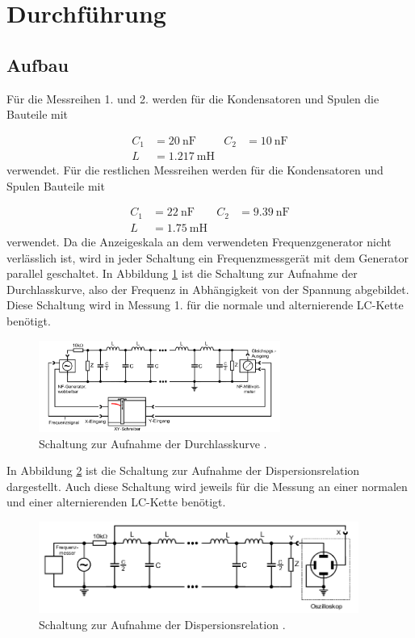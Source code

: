  \section{Durchführung}
\label{sec:Durchführung}


\subsection{Aufbau}

Für die Messreihen 1. und 2. werden für die Kondensatoren und Spulen die
Bauteile mit

\begin{align}
  C_1 & = \SI{20}{\nano\F} & C_2 & = \SI{10}{\nano\F} \\
  L & = \SI{1.217}{\milli\henry}
\end{align}
verwendet. Für die restlichen Messreihen werden für die Kondensatoren und Spulen
Bauteile mit

\begin{align}
  C_1 & = \SI{22}{\nano\F} & C_2 & = \SI{9.39}{\nano\F} \\
  L & = \SI{1.75}{\milli\henry}
\end{align}
verwendet.
Da die Anzeigeskala an dem verwendeten Frequenzgenerator nicht verlässlich ist,
wird in jeder Schaltung ein Frequenzmessgerät mit dem Generator parallel
geschaltet.
In Abbildung \ref{fig:DK} ist die Schaltung zur Aufnahme der Durchlasskurve,
also der Frequenz in Abhängigkeit von der Spannung abgebildet.
Diese Schaltung wird in Messung 1. für die normale und alternierende LC-Kette
benötigt.

\begin{figure}
  \centering
  \includegraphics[height=3cm]{DurchlasskurveLCkette.png}
  \caption{Schaltung zur Aufnahme der Durchlasskurve \cite{anleitung}.}
  \label{fig:DK}
\end{figure}

In Abbildung \ref{fig:DR} ist die Schaltung zur Aufnahme der
Dispersionsrelation dargestellt. Auch diese Schaltung wird jeweils für die
Messung an einer normalen und einer alternierenden LC-Kette benötigt.

\begin{figure}
  \centering
  \includegraphics[height=3cm]{DispersionC1C2.png}
  \caption{Schaltung zur Aufnahme der Dispersionsrelation \cite{anleitung}.}
  \label{fig:DR}
\end{figure}


